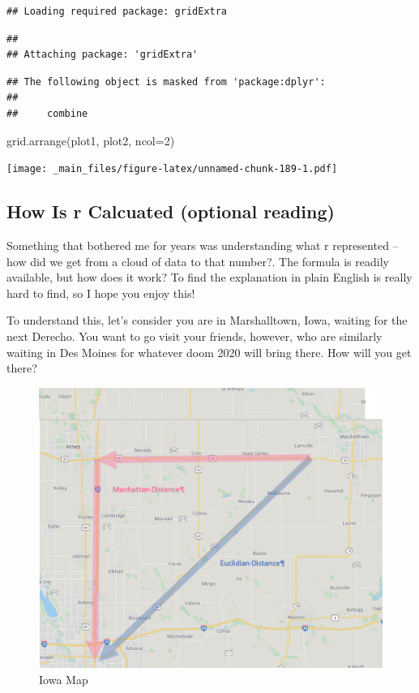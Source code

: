 \documentclass[
]{book}
\newenvironment{Shaded}{\begin{snugshade}}{\end{snugshade}}
\newcommand{\AttributeTok}[1]{\textcolor[rgb]{0.77,0.63,0.00}{#1}}
\newcommand{\DecValTok}[1]{\textcolor[rgb]{0.00,0.00,0.81}{#1}}
\newcommand{\FunctionTok}[1]{\textcolor[rgb]{0.00,0.00,0.00}{#1}}
\newcommand{\NormalTok}[1]{#1}
\begin{document}
\begin{verbatim}
## Loading required package: gridExtra
\end{verbatim}

\begin{verbatim}
## 
## Attaching package: 'gridExtra'
\end{verbatim}

\begin{verbatim}
## The following object is masked from 'package:dplyr':
## 
##     combine
\end{verbatim}

\begin{Shaded}
\begin{Highlighting}[]
\FunctionTok{grid.arrange}\NormalTok{(plot1, plot2, }\AttributeTok{ncol=}\DecValTok{2}\NormalTok{)}
\end{Highlighting}
\end{Shaded}

\texttt{[image: \_main\_files/figure-latex/unnamed-chunk-189-1.pdf]}

\hypertarget{how-is-r-calcuated-optional-reading}{%
\subsection{How Is r Calcuated (optional reading)}\label{how-is-r-calcuated-optional-reading}}

Something that bothered me for years was understanding what r represented -- how did we get from a cloud of data to that number?. The formula is readily available, but how does it work? To find the explanation in plain English is really hard to find, so I hope you enjoy this!

To understand this, let's consider you are in Marshalltown, Iowa, waiting for the next Derecho. You want to go visit your friends, however, who are similarly waiting in Des Moines for whatever doom 2020 will bring there. How will you get there?

\begin{figure}
\centering
\includegraphics{data-unit-10/marshalltown_dsm_euclidian.png}
\caption{Iowa Map}
\end{figure}
\end{document}
